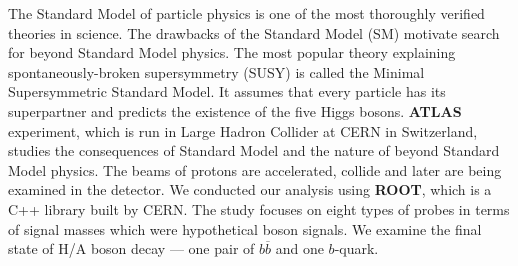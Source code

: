 The Standard Model of particle physics is one of the most thoroughly verified theories in science.
The drawbacks of the Standard Model (SM) motivate search for beyond
Standard Model physics. The most popular theory explaining spontaneously-broken supersymmetry (SUSY) is called
the Minimal Supersymmetric Standard Model. It assumes that every particle has its superpartner and 
predicts the existence of the five Higgs bosons.
\textbf{ATLAS} experiment, which is run in Large Hadron Collider at CERN in Switzerland, studies the consequences of
Standard Model
and the nature of beyond Standard Model physics. The beams of protons are accelerated, collide and later are being 
examined in the detector.
We conducted our analysis using \textbf{ROOT}, which is a C++ library built by CERN.
The study focuses on eight types of probes in terms of signal masses which were hypothetical boson signals. 
We examine the final state of H/A boson decay --- one pair of $b\overline{b}$ and one $b$-quark.


